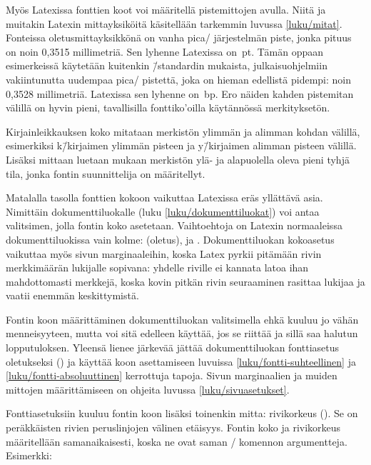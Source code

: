 Myös Latexissa fonttien koot voi määritellä pistemittojen avulla. Niitä
ja muitakin Latexin mittayksiköitä käsitellään tarkemmin luvussa
\ref{luku/mitat}. Fonteissa oletusmittayksikkönä on vanha pica\-/
järjestelmän piste, jonka pituus on noin 0,3515 millimetriä. Sen lyhenne
Latexissa on~pt. Tämän oppaan esimerkeissä käytetään kuitenkin
 \=/standardin mukaista, julkaisuohjelmiin
vakiintunutta uudempaa pica\-/ pistettä, joka on hieman edellistä
pidempi: noin 0,3528 millimetriä. Latexissa sen lyhenne on~bp. Ero
näiden kahden pistemitan välillä on hyvin pieni, tavallisilla
fonttiko'oilla käytännössä merkityksetön.

Kirjainleikkauksen koko mitataan merkistön ylimmän ja alimman kohdan
välillä, esimerkiksi k\=/kirjaimen ylimmän pisteen ja y\=/kirjaimen
alimman pisteen välillä. Lisäksi mittaan luetaan mukaan merkistön ylä-
ja alapuolella oleva pieni tyhjä tila, jonka fontin suunnittelija on
määritellyt.

Matalalla tasolla fonttien kokoon vaikuttaa Latexissa eräs yllättävä
asia. Nimittäin dokumenttiluokalle (luku \ref{luku/dokumenttiluokat})
voi antaa valitsimen, jolla fontin koko asetetaan. Vaihtoehtoja on
Latexin normaaleissa dokumenttiluokissa vain kolme: \koodi{10pt}
(oletus), \koodi{11pt} ja \koodi{12pt}. Dokumenttiluokan kokoasetus
vaikuttaa myös sivun marginaaleihin, koska Latex pyrkii pitämään rivin
merkkimäärän lukijalle sopivana: yhdelle riville ei kannata latoa ihan
mahdottomasti merkkejä, koska kovin pitkän rivin seuraaminen rasittaa
lukijaa ja vaatii enemmän keskittymistä.

Fontin koon määrittäminen dokumenttiluokan valitsimella ehkä kuuluu jo
vähän menneisyyteen, mutta voi sitä edelleen käyttää, jos se riittää ja
sillä saa halutun lopputuloksen. Yleensä lienee järkevää jättää
dokumenttiluokan fonttiasetus oletukseksi (\koodi{10pt}) ja käyttää koon
asettamiseen luvuissa \ref{luku/fontti-suhteellinen} ja
\ref{luku/fontti-absoluuttinen} kerrottuja tapoja. Sivun marginaalien ja
muiden mittojen määrittämiseen on ohjeita luvussa
\ref{luku/sivuasetukset}.

Fonttiasetuksiin kuuluu fontin koon lisäksi toinenkin mitta: rivikorkeus
(). Se on peräkkäisten rivien peruslinjojen välinen
etäisyys. Fontin koko ja rivikorkeus määritellään samanaikaisesti, koska
ne ovat saman \-/ komennon argumentteja. Esimerkki:

\begin{koodilohkosis}
\fontsize{10bp}{12bp} \selectfont
\end{koodilohkosis}

